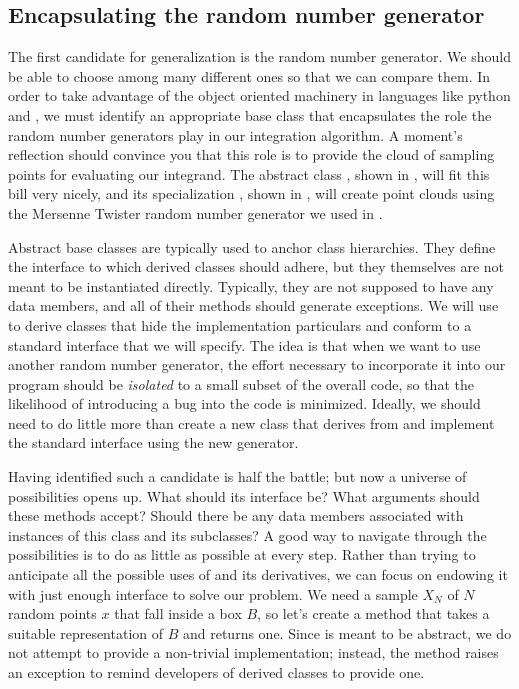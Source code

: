 \subsection{Encapsulating the random number generator}
\label{sec:classes:pointcloud}

The first candidate for generalization is the random number generator. We should be able to
choose among many different ones so that we can compare them. In order to take advantage of the
object oriented machinery in languages like python and \cpp, we must identify an appropriate
base class that encapsulates the role the random number generators play in our integration
algorithm. A moment's reflection should convince you that this role is to provide the cloud of
sampling points for evaluating our integrand. The abstract class , shown in
, will fit this bill very nicely, and its specialization
, shown in , will create point clouds using the
Mersenne Twister random number generator we used in .

Abstract base classes are typically used to anchor class hierarchies. They define the interface
to which derived classes should adhere, but they themselves are not meant to be instantiated
directly. Typically, they are not supposed to have any data members, and all of their methods
should generate exceptions. We will use  to derive classes that hide the
implementation particulars and conform to a standard interface that we will specify.  The idea
is that when we want to use another random number generator, the effort necessary to
incorporate it into our program should be {\em isolated} to a small subset of the overall code,
so that the likelihood of introducing a bug into the code is minimized.  Ideally, we should
need to do little more than create a new class that derives from  and
implement the standard interface using the new generator.

Having identified such a candidate is half the battle; but now a universe of possibilities
opens up. What should its interface be? What arguments should these methods accept? Should
there be any data members associated with instances of this class and its subclasses? A good
way to navigate through the possibilities is to do as little as possible at every step. Rather
than trying to anticipate all the possible uses of  and its derivatives, we
can focus on endowing it with just enough interface to solve our problem. We need a sample
$X_{N}$ of $N$ random points $x$ that fall inside a box $B$, so let's create a method
 that takes a suitable representation of $B$ and returns one.
%
%
Since  is meant to be abstract, we do not attempt to provide a non-trivial
implementation; instead, the method  raises an exception to remind developers of
derived classes to provide one.

